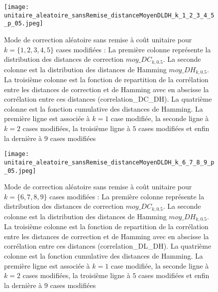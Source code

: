 \label{annexe_distribution_0_9}

\begin{figure}[htb!] 
\centering
\texttt{[image: unitaire\_aleatoire\_sansRemise\_distanceMoyenDLDH\_k\_1\_2\_3\_4\_5\_p\_05.jpeg]}
\caption{ Mode de correction al\'eatoire sans remise \`a co\^ut unitaire pour $k =\{1,2,3,4,5\} $ cases modifi\'ees : La premi\`ere colonne repr\'esente la distribution des distances de correction $moy\_DC_{k,0.5}$. La seconde colonne est la distribution des distances de Hamming $moy\_DH_{k,0.5}$. La troisi\`eme colonne  est la fonction de repartition de la corr\'elation entre les distances de correction et de Hamming avec en abscisse la corr\'elation entre ces distances (correlation\_DC\_DH).  La quatri\`eme colonne est la fonction cumulative des distances de Hamming. La premi\`ere ligne est associ\'ee \`a $k=1$ case modifi\'ee, la seconde ligne \`a $k=2$ cases modifi\'ees, la troisi\`eme ligne \`a $5$ cases modifi\'ees et enfin la derni\`ere \`a $9$ cases modifi\'ees}
\label{sansremise_unitaire_distanceMoyenDCDH_k_1_5_aleatoire_p_05} 
\end{figure}


\begin{figure}[htb!] 
\centering
\texttt{[image: unitaire\_aleatoire\_sansRemise\_distanceMoyenDLDH\_k\_6\_7\_8\_9\_p\_05.jpeg]}
\caption{ Mode de correction al\'eatoire sans remise \`a co\^ut unitaire pour $k =\{6,7,8,9\} $ cases modifi\'ees : La premi\`ere colonne repr\'esente la distribution des distances de correction $moy\_DC_{k,0.5}$. La seconde colonne est la distribution des distances de Hamming $moy\_DH_{k,0.5}$. La troisi\`eme colonne  est la fonction de repartition de la corr\'elation entre les distances de correction et de Hamming avec en abscisse la corr\'elation entre ces distances (correlation\_DL\_DH).  La quatri\`eme colonne est la fonction cumulative des distances de Hamming. La premi\`ere ligne est associ\'ee \`a $k=1$ case modifi\'ee, la seconde ligne \`a $k=2$ cases modifi\'ees, la troisi\`eme ligne \`a $5$ cases modifi\'ees et enfin la derni\`ere \`a $9$ cases modifi\'ees}
\label{sansremise_unitaire_distanceMoyenDCDH_k_6_9_aleatoire_p_05} 
\end{figure}

